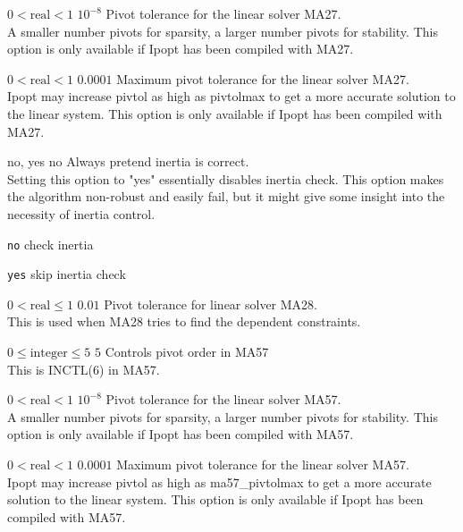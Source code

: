 %
{$0<\textrm{real}<1$}%
{$10^{- 8}$}%
{Pivot tolerance for the linear solver MA27.\\
A smaller number pivots for sparsity, a larger number pivots for stability.  This option is only available if Ipopt has been compiled with MA27.}%
{}

%
{$0<\textrm{real}<1$}%
{$0.0001$}%
{Maximum pivot tolerance for the linear solver MA27.\\
Ipopt may increase pivtol as high as pivtolmax to get a more accurate solution to the linear system.  This option is only available if Ipopt has been compiled with MA27.}%
{}

%
{no, yes}%
{no}%
{Always pretend inertia is correct.\\
Setting this option to "yes" essentially disables inertia check. This option makes the algorithm non-robust and easily fail, but it might give some insight into the necessity of inertia control.}%
{\begin{list}{}{
\setlength{\parsep}{0em}
\setlength{\leftmargin}{5ex}
\setlength{\labelwidth}{2ex}
\setlength{\itemindent}{0ex}
\setlength{\topsep}{0pt}}
\item[\texttt{no}] check inertia
\item[\texttt{yes}] skip inertia check
\end{list}
}

%
{$0<\textrm{real}\leq1$}%
{$0.01$}%
{Pivot tolerance for linear solver MA28.\\
This is used when MA28 tries to find the dependent constraints.}%
{}

%
{$0\leq\textrm{integer}\leq5$}%
{$5$}%
{Controls pivot order in MA57\\
This is INCTL(6) in MA57.}%
{}

%
{$0<\textrm{real}<1$}%
{$10^{- 8}$}%
{Pivot tolerance for the linear solver MA57.\\
A smaller number pivots for sparsity, a larger number pivots for stability. This option is only available if Ipopt has been compiled with MA57.}%
{}

%
{$0<\textrm{real}<1$}%
{$0.0001$}%
{Maximum pivot tolerance for the linear solver MA57.\\
Ipopt may increase pivtol as high as ma57\_pivtolmax to get a more accurate solution to the linear system.  This option is only available if Ipopt has been compiled with MA57.}%
{}

